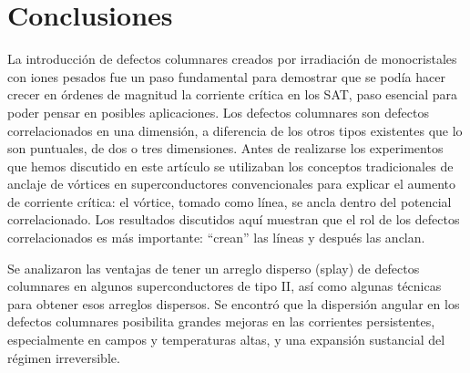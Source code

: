 \documentclass[a4paper,conference]{IEEEtran}
\begin{document}
\section{Conclusiones}\label{sec:conclusions}

La introducci\'{o}n de defectos columnares creados por irradiaci\'{o}n de monocristales
con iones pesados fue un paso fundamental para demostrar que se pod\'{i}a hacer
crecer en \'{o}rdenes de magnitud la corriente cr\'{i}tica en los SAT, paso esencial
para poder pensar en posibles aplicaciones. Los defectos columnares son defectos
correlacionados en una dimensi\'{o}n, a diferencia de los otros tipos existentes
que lo son puntuales, de dos o tres dimensiones. Antes de realizarse los
experimentos que hemos discutido en este
art\'{i}culo se utilizaban los conceptos tradicionales de anclaje de v\'{o}rtices en
superconductores convencionales para explicar el aumento de corriente cr\'{i}tica:
el v\'{o}rtice, tomado como l\'{i}nea, se ancla dentro del potencial correlacionado. Los
resultados discutidos aqu\'{i} muestran que el rol de los defectos correlacionados
es m\'{a}s importante: ``crean'' las l\'{i}neas y despu\'{e}s las anclan.

Se analizaron las ventajas de tener un arreglo disperso (splay) de defectos
columnares en algunos superconductores de tipo II, as\'{i} como algunas t\'{e}cnicas
para obtener esos arreglos dispersos. Se encontr\'{o} que la dispersi\'{o}n angular en
los defectos columnares posibilita grandes mejoras en las corrientes
persistentes, especialmente en campos y temperaturas altas, y una expansi\'{o}n
sustancial del r\'{e}gimen irreversible.
%
%

%
%
%
\end{document}
